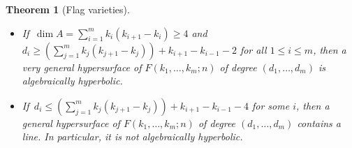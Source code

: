 \documentclass[11pt]{amsart}
\numberwithin{equation}{section}
\newtheorem{theorem}{Theorem}[section]
\theoremstyle{definition}
\theoremstyle{remark}
\begin{document}
\begin{theorem}[Flag varieties] \leavevmode
    \begin{itemize}
        \item If\, $\dim A = \sum_{i=1}^{m}k_{i}(k_{i+1}-k_i)\ge 4$ and $d_{i}\ge \left (\sum_{j=1}^{m}k_{j}(k_{j+1}-k_j)\right ) + k_{i+1} - k_{i-1} - 2$ for all $1\le i\le m$, then a very general hypersurface of $F(k_1, \hdots, k_m; n)$ of degree $(d_1, \hdots, d_m)$ is algebraically hyperbolic.
        \item If\, $d_{i}\le \left (\sum_{j=1}^{m}k_{j}(k_{j+1}-k_j)\right ) + k_{i+1} - k_{i-1} - 4$ for some $i$, then a general hypersurface of $F(k_1, \hdots, k_m; n)$ of degree $(d_1, \hdots, d_m)$ contains a line. In particular, it is not algebraically hyperbolic.
    \end{itemize}    
\end{theorem}

\end{document}

